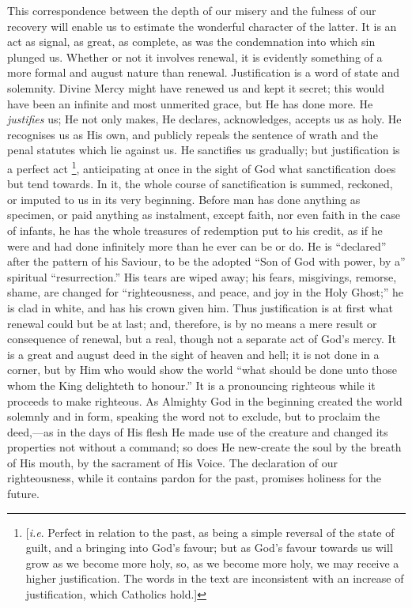 This correspondence between the depth of our misery and the fulness
of our recovery will enable us to estimate the wonderful character of
the latter. It is an act as signal, as great, as complete, as was the
condemnation into which sin plunged us. Whether or not it involves
renewal, it is evidently something of a more formal and august nature
than renewal. Justification is a word of state and solemnity. Divine
Mercy might have renewed us and kept it secret; this would have been
an infinite and most unmerited grace, but He has done more. He \emph{justifies}
us; He not only makes, He declares, acknowledges, accepts us as holy.
He recognises us as His own, and publicly repeals the sentence of
wrath and the penal statutes which lie against us. He sanctifies us
gradually; but justification is a perfect act \footnote{[\emph{i.e}.
Perfect in relation to the past, as being a simple reversal of the
state of guilt, and a bringing into God's favour; but as God's favour
towards us will grow as we become more holy, so, as we become more
holy, we may receive a higher justification. The words in the text are
inconsistent with an increase of justification, which Catholics hold.]}, anticipating at once in the sight of God what sanctification
does but tend towards. In it, the whole course of sanctification is
summed, reckoned, or imputed to us in its very beginning. Before man
has done anything as specimen, or paid anything as instalment,
except faith, nor even faith in the case of infants, he has the whole
treasures of redemption put to his credit, as if he were and had done
infinitely more than he ever can be or do. He is ``declared''
after the pattern of his Saviour, to be the adopted ``Son of God
with power, by a'' spiritual ``resurrection.'' His tears
are wiped away; his fears, misgivings, remorse, shame, are changed for
``righteousness, and peace, and joy in the Holy Ghost;'' he is
clad in white, and has his crown given him. Thus justification is at
first what renewal could but be at last; and, therefore, is by no
means a mere result or consequence of renewal, but a real, though not
a separate act of God's mercy. It is a great and august deed in the
sight of heaven and hell; it is not done in a corner, but by Him who
would show the world ``what should be done unto those whom the
King delighteth to honour.'' It is a pronouncing righteous while
it proceeds to make righteous. As Almighty God in the beginning
created the world solemnly and in form, speaking the word not to
exclude, but to proclaim the deed,—as in the days of His flesh He
made use of the creature and changed its properties not without a
command; so does He new-create the soul by the breath of His mouth, by
the sacrament of His Voice. The declaration of our righteousness,
while it contains pardon for the past, promises holiness for the
future.

